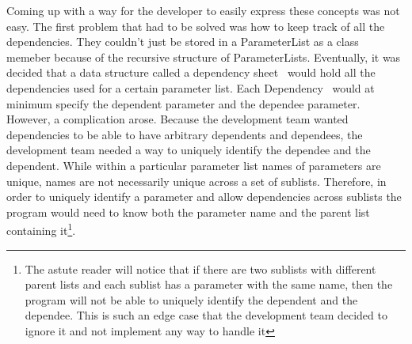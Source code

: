 	Coming up with a way for the developer to easily express these concepts was not easy. The first problem that had to be solved was how to keep track of all the dependencies.
	They couldn't just be stored in a ParameterList as a class memeber because of the recursive structure of ParameterLists. Eventually, it was decided that a data structure called
	a dependency sheet~\cite{DependencySheet} would hold all the dependencies used for a certain parameter list. Each Dependency~\cite{Dependency} would at minimum specify the dependent parameter
	and the dependee parameter. However, a complication arose. Because the development team wanted dependencies to be able to have arbitrary dependents and dependees, the development team needed
	a way to uniquely identify the dependee and the dependent. While within a particular parameter list names of parameters are unique, names are not 
	necessarily unique across a set of sublists. Therefore, in order to uniquely identify a parameter and allow dependencies across sublists the program would need
	to know both the parameter name and the parent list containing it\footnote{The astute reader will notice that if there are two sublists with different parent lists 
	and each sublist has a parameter with the same name, then the program will not be able to uniquely identify the dependent and the dependee. This is such an edge case that the development team decided
	to ignore it and not implement any way to handle it}.
	
